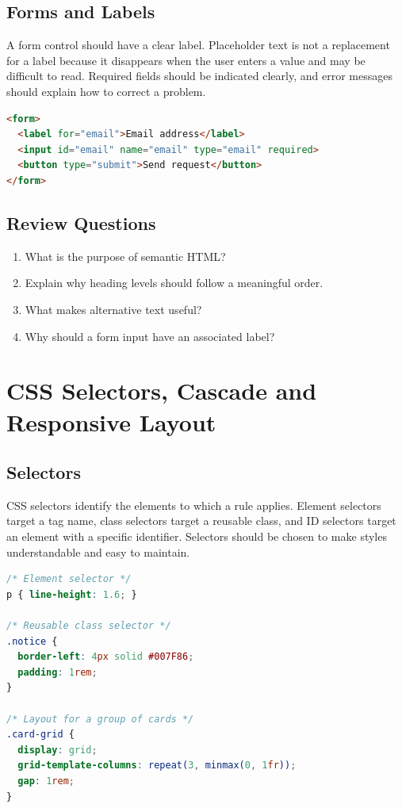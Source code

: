 \documentclass[11pt,openany,oneside]{book}
\begin{document}
\section{Forms and Labels}
A form control should have a clear label. Placeholder text is not a replacement for a label because it disappears when the user enters a value and may be difficult to read. Required fields should be indicated clearly, and error messages should explain how to correct a problem.

\begin{lstlisting}[style=webcode,language=HTML]
<form>
  <label for="email">Email address</label>
  <input id="email" name="email" type="email" required>
  <button type="submit">Send request</button>
</form>
\end{lstlisting}

\section*{Review Questions}
\begin{enumerate}
\item What is the purpose of semantic HTML?
\item Explain why heading levels should follow a meaningful order.
\item What makes alternative text useful?
\item Why should a form input have an associated label?
\end{enumerate}

\chapter{CSS Selectors, Cascade and Responsive Layout}
\section{Selectors}
CSS selectors identify the elements to which a rule applies. Element selectors target a tag name, class selectors target a reusable class, and ID selectors target an element with a specific identifier. Selectors should be chosen to make styles understandable and easy to maintain.

\begin{lstlisting}[style=webcode,language=CSS]
/* Element selector */
p { line-height: 1.6; }

/* Reusable class selector */
.notice {
  border-left: 4px solid #007F86;
  padding: 1rem;
}

/* Layout for a group of cards */
.card-grid {
  display: grid;
  grid-template-columns: repeat(3, minmax(0, 1fr));
  gap: 1rem;
}
\end{lstlisting}
\end{document}

